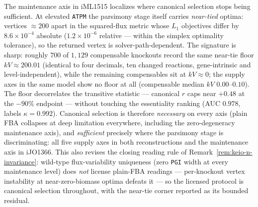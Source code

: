 \begin{remark}
\label{rem:canonical-scope}
The maintenance axis in iML1515 localizes where canonical
selection stops being sufficient. At elevated \texttt{ATPM} the
parsimony stage itself carries \emph{near-tied} optima: vertices
$\approx200$ apart in the squared-flux metric whose $L_1$
objectives differ by $8.6\times10^{-4}$ absolute ($1.2\times10^{-6}$
relative --- within the simplex optimality tolerance), so the
returned vertex is solver-path-dependent. The signature is sharp:
roughly $700$ of $1{,}129$ compensable knockouts record the same
near-tie floor $kV\approx200.01$ (identical to four decimals, ten
changed reactions, gene-intrinsic and level-independent), while
the remaining compensables sit at $kV\approx0$; the supply axes in
the same model show no floor at all (compensable median $kV$
$0.00$--$0.10$). The floor decorrelates the transitive statistic
--- canonical $r$ caps near $+0.48$ at the $-90\%$ endpoint ---
without touching the essentiality ranking (AUC $0.978$, labels
$\kappa=0.992$). Canonical selection is therefore \emph{necessary}
on every axis (plain FBA collapses at deep limitation everywhere,
including the zero-degeneracy maintenance axis), and
\emph{sufficient} precisely where the parsimony stage is
discriminating: all five supply axes in both reconstructions and
the maintenance axis in iJO1366. This also revises the closing
reading rule of Remark~\ref{rem:keio-n-invariance}: wild-type
flux-variability uniqueness (zero \texttt{PGI} width at every
maintenance level) does \emph{not} license plain-FBA readings ---
per-knockout vertex instability at near-zero-biomass optima
defeats it --- so the licensed protocol is canonical selection
throughout, with the near-tie corner reported as its bounded
residual.
\end{remark}
